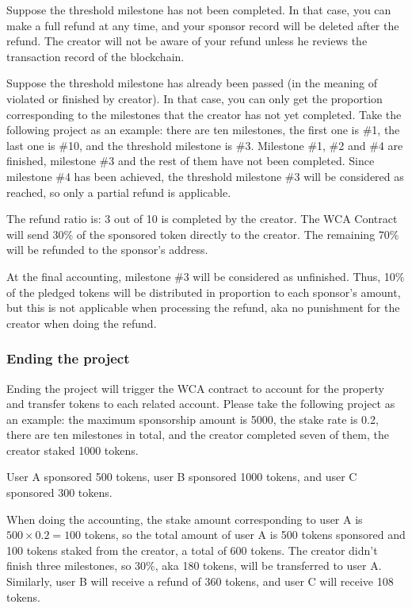 Suppose the threshold milestone has not been completed.
In that case, you can make a full refund at any time, and your sponsor record
will be deleted after the refund.
The creator will not be aware of your refund unless he reviews the transaction
record of the blockchain.

Suppose the threshold milestone has already been passed (in the meaning of
violated or finished by creator).
In that case, you can only get the proportion corresponding to the milestones
that the creator has not yet completed.
Take the following project as an example: there are ten milestones, the first
one is \#1, the last one is \#10, and the threshold milestone is \#3.
Milestone \#1, \#2 and \#4 are finished, milestone \#3 and the rest of them
have not been completed.
Since milestone \#4 has been achieved, the threshold milestone \#3 will be
considered as reached, so only a partial refund is applicable.

The refund ratio is: 3 out of 10 is completed by the creator.
The WCA Contract will send 30\% of the sponsored token directly to the creator.
The remaining 70\% will be refunded to the sponsor's address.

At the final accounting, milestone \#3 will be considered as unfinished.
Thus, 10\% of the pledged tokens will be distributed in proportion to
each sponsor's amount, but this is not applicable when processing the refund,
aka no punishment for the creator when doing the refund.

\subsubsection{Ending the project}

Ending the project will trigger the WCA contract to account for the property
and transfer tokens to each related account.
Please take the following project as an example: the maximum sponsorship amount
is 5000, the stake rate is 0.2, there are ten milestones in total, and the
creator completed seven of them, the creator staked 1000 tokens.

User A sponsored 500 tokens, user B sponsored 1000 tokens, and user C sponsored
300 tokens.

When doing the accounting, the stake amount corresponding to user A is
$500 \times 0.2 = 100$ tokens, so the total amount of user A is 500 tokens
sponsored and 100 tokens staked from the creator, a total of 600 tokens.
The creator didn't finish three milestones, so 30\%, aka 180 tokens, will be
transferred to user A\@.
Similarly, user B will receive a refund of 360 tokens, and user C will receive
108 tokens.


